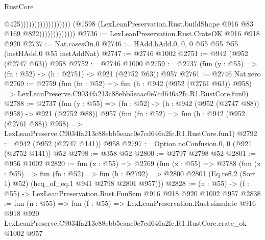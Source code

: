 \begin{lexlean}{RustCore}
\begin{coremodule}
                                                              @425))))))))))))))))))
                          (@1598
                            (LexLeanPreservation.Rust.buildShape @916 @83 @169 @822)))))))))))))
@2736 := LexLeanPreservation.Rust.CrateOK @916 @918 @920
@2737 := Nat.casesOn.{0}
@2746 := HAdd.hAdd.{0, 0, 0} @55 @55 @55 (instHAdd.{0} @55 instAddNat)
@2747 := @2746 @1002
@2751 := @942 (@952 (@2747 @63)) @958
@2752 := @2746 @1000
@2759 := @2737 (fun (y : @55) => (fn : @52) -> (h : @2751) -> @921 (@2752 @63)) @957
@2761 := @2746 Nat.zero
@2769 := @2759
    (fun (fn : @52) =>
    fun (h : @942 (@952 (@2761 @63)) @958) =>
    LexLeanPreserve.C9034fa213c88ebb5eaac0e7cd646a2fc.R1.RustCore.fun0)
@2788 := @2737
    (fun (y : @55) => (fn : @52) -> (h : @942 (@952 (@2747 @88)) @958) -> @921 (@2752 @88))
    @957
    (fun (fn : @52) =>
    fun (h : @942 (@952 (@2761 @88)) @958) =>
    LexLeanPreserve.C9034fa213c88ebb5eaac0e7cd646a2fc.R1.RustCore.fun1)
@2792 := @942 (@952 (@2747 @141)) @958
@2797 := Option.noConfusion.{0, 0} (@921 (@2752 @141)) @52
@2798 := @358 @52
@2800 := @2797 @2798 @52
@2801 := @956 @1002
@2820 := fun (x : @55) =>
  @2769
    (fun (x : @55) =>
    @2788
      (fun (x : @55) =>
      fun (fn : @52) =>
      fun (h : @2792) =>
      @2800 @2801 (Eq.refl.{2} (Sort 1) @52) (heq_of_eq.{1} @941 @2798 @2801 @957)))
@2828 := (n : @55) -> (f : @55) -> LexLeanPreservation.Rust.FunSem @916 @918 @920 @1002 @957
@2838 := fun (n : @55) =>
  fun (f : @55) =>
  LexLeanPreservation.Rust.simulate
    @916
    @918
    @920
    LexLeanPreserve.C9034fa213c88ebb5eaac0e7cd646a2fc.R1.RustCore.crate_ok
    @1002
    @957
\end{coremodule}
\end{lexlean}
